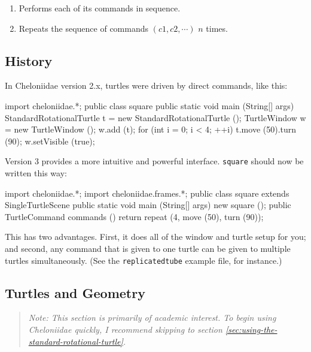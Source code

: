 \documentclass{article}
\def\command[#1]{\item[\tt #1]}
\begin{document}
        \begin{enumerate}
          \command[sequence(c1, c2, c3, ...)] Performs each of its commands in sequence.
          \command[repeat(n, c1, c2, ...)]    Repeats the sequence of commands $(c1, c2, \cdots)$ $n$ times.
        \end{enumerate}

    \subsection{History}
      \label{sec:history}

      In Cheloniidae version 2.x, turtles were driven by direct commands, like this:

      \begin{java}
import cheloniidae.*;
public class square {
  public static void main (String[] args) {
    StandardRotationalTurtle t = new StandardRotationalTurtle ();
    TurtleWindow             w = new TurtleWindow ();
    w.add (t);
    for (int i = 0; i < 4; ++i) t.move (50).turn (90);
    w.setVisible (true);
  }
}     \end{java}

      Version 3 provides a more intuitive and powerful interface. {\tt square} should now be written this way:

      \begin{java}
import cheloniidae.*;
import cheloniidae.frames.*;
public class square extends SingleTurtleScene {
  public static void main (String[] args) {new square ();}
  public TurtleCommand commands () {
    return repeat (4, move (50), turn (90));
  }
}     \end{java}

      This has two advantages. First, it does all of the window and turtle setup for you; and second, any command that is given to one turtle can be given to
      multiple turtles simultaneously. (See the {\tt replicatedtube} example file, for instance.)

    \subsection{Turtles and Geometry}
      \label{sec:turtles-and-geometry}

      \begin{quote}
      {\em Note: This section is primarily of academic interest. To begin using Cheloniidae quickly, I recommend skipping to section
      \ref{sec:using-the-standard-rotational-turtle}.}
      \end{quote}
\end{document}
